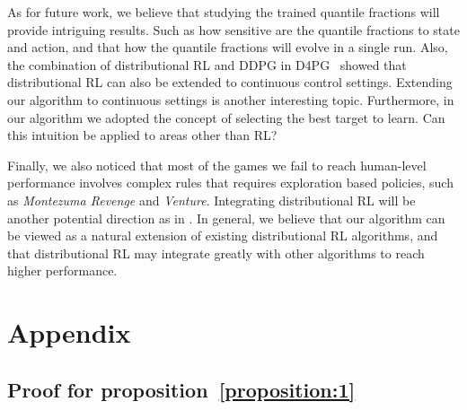\documentclass{article}
\begin{document}
As for future work, we believe that studying the trained quantile fractions will provide intriguing results. Such as how sensitive are the quantile fractions to state and action, and that how the quantile fractions will evolve in a single run. Also, the combination of distributional RL and DDPG in D4PG~\citep{barth2018distributed} showed that distributional RL can also be extended to continuous control settings. Extending our algorithm to continuous settings is another interesting topic. Furthermore, in our algorithm we adopted the concept of selecting the best target to learn. Can this intuition be applied to areas other than RL?

Finally, we also noticed that most of the games we fail to reach human-level performance involves complex rules that requires exploration based policies, such as \textit{Montezuma Revenge} and \textit{Venture}. Integrating distributional RL will be another potential direction as in \citep{tang2018exploration}. In general, we believe that our algorithm can be viewed as a natural extension of existing distributional RL algorithms, and that distributional RL may integrate greatly with other algorithms to reach higher performance.



\newpage














\section*{Appendix}
\subsection*{Proof for proposition~\ref{proposition:1}}
\prop*
 
\end{document}
